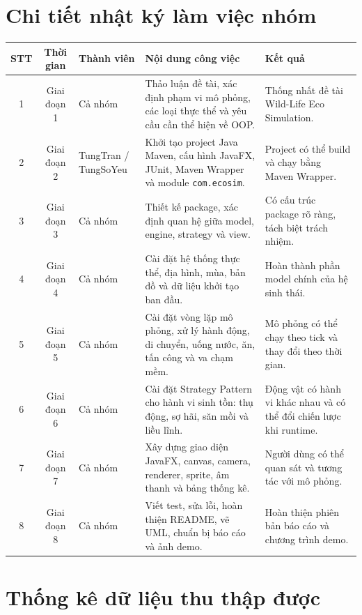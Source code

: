 \documentclass[12pt,a4paper]{article}
\begin{document}
\section{Chi tiết nhật ký làm việc nhóm}

\begin{longtable}{|c|c|p{4cm}|p{6cm}|p{3cm}|}
    \hline
    \textbf{STT} & \textbf{Thời gian} & \textbf{Thành viên} & \textbf{Nội dung công việc} & \textbf{Kết quả} \\
    \hline
    1 & Giai đoạn 1 & Cả nhóm & Thảo luận đề tài, xác định phạm vi mô phỏng, các loại thực thể và yêu cầu cần thể hiện về OOP. & Thống nhất đề tài Wild-Life Eco Simulation. \\
    \hline
    2 & Giai đoạn 2 & TungTran / TungSoYeu & Khởi tạo project Java Maven, cấu hình JavaFX, JUnit, Maven Wrapper và module \texttt{com.ecosim}. & Project có thể build và chạy bằng Maven Wrapper. \\
    \hline
    3 & Giai đoạn 3 & Cả nhóm & Thiết kế package, xác định quan hệ giữa model, engine, strategy và view. & Có cấu trúc package rõ ràng, tách biệt trách nhiệm. \\
    \hline
    4 & Giai đoạn 4 & Cả nhóm & Cài đặt hệ thống thực thể, địa hình, mùa, bản đồ và dữ liệu khởi tạo ban đầu. & Hoàn thành phần model chính của hệ sinh thái. \\
    \hline
    5 & Giai đoạn 5 & Cả nhóm & Cài đặt vòng lặp mô phỏng, xử lý hành động, di chuyển, uống nước, ăn, tấn công và va chạm mềm. & Mô phỏng có thể chạy theo tick và thay đổi theo thời gian. \\
    \hline
    6 & Giai đoạn 6 & Cả nhóm & Cài đặt Strategy Pattern cho hành vi sinh tồn: thụ động, sợ hãi, săn mồi và liều lĩnh. & Động vật có hành vi khác nhau và có thể đổi chiến lược khi runtime. \\
    \hline
    7 & Giai đoạn 7 & Cả nhóm & Xây dựng giao diện JavaFX, canvas, camera, renderer, sprite, âm thanh và bảng thống kê. & Người dùng có thể quan sát và tương tác với mô phỏng. \\
    \hline
    8 & Giai đoạn 8 & Cả nhóm & Viết test, sửa lỗi, hoàn thiện README, vẽ UML, chuẩn bị báo cáo và ảnh demo. & Hoàn thiện phiên bản báo cáo và chương trình demo. \\
    \hline
\end{longtable}

\section{Thống kê dữ liệu thu thập được}
\end{document}
